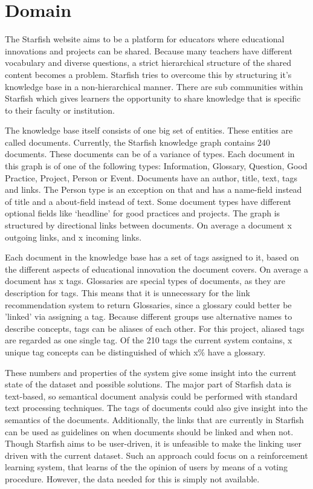 

\section{Domain}
The Starfish website aims to be a platform for educators where educational innovations and projects can be shared. Because many teachers have different vocabulary and diverse questions, a strict hierarchical structure of the shared content becomes a problem. Starfish tries to overcome this by structuring it's knowledge base in a non-hierarchical manner. There are sub communities within Starfish which gives learners the opportunity to share knowledge that is specific to their faculty or institution. 

The knowledge base itself consists of one big set of entities. These entities are called documents. Currently, the Starfish knowledge graph contains 240 documents. These documents can be of a variance of types. Each document in this graph is of one of the following types: Information, Glossary, Question, Good Practice, Project, Person or Event. Documents have an author, title, text, tags and links. The Person type is an exception on that and has a name-field instead of title and a about-field instead of text. Some document types have different optional fields like `headline' for good practices and projects. The graph is structured by directional links between documents.  On average a document x outgoing links, and x incoming links.

Each document in the knowledge base has a set of tags assigned to it, based on the different aspects of educational innovation the document covers. On average a document has x tags. Glossaries are special types of documents, as they are description for tags. This means that it is unnecessary for the link recommendation system to return Glossaries, since a glossary could better be 'linked' via assigning a tag. Because different groups use alternative names to describe concepts, tags can be aliases of each other. For this project, aliased tags are regarded as one single tag. Of the 210 tags the current system contains, x unique tag concepts can be distinguished of which x\% have a glossary. 

These numbers and properties of the system give some insight into the current state of the dataset and possible solutions. The major part of Starfish data is text-based, so semantical document analysis could be performed with standard text processing techniques. The tags of documents could also give insight into the semantics of the documents. Additionally, the links that are currently in Starfish can be used as guidelines on when documents should be linked and when not. Though Starfish aims to be user-driven, it is unfeasible to make the linking user driven with the current dataset. Such an approach could focus on a reinforcement learning system, that learns of the the opinion of users by means of a voting procedure. However, the data needed for this is simply not available. 
